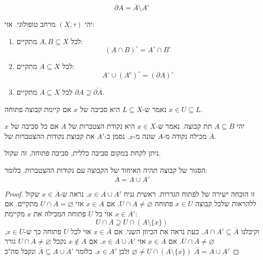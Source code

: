 \documentclass{tstextbook}
\begin{document}
\begin{definition}
$$\partial A=\overline{A} \setminus  A^{\circ }$$

\end{definition}
\begin{proposition}
יהי \((X,\tau)\) מרחב טופולוגי. אזי:

  \begin{enumerate}
    \item לכל \(A,B \subseteq X\) מתקיים: 
$$(A\cap  B)^{\circ }=A^{\circ }\cap  B^{\circ }$$


    \item לכל \(A\subseteq X\) מתקיים: 
$$A^{\circ }\cup  (A^{c})^{\circ }=(\partial A)^{\circ }$$


    \item לכל \(A\subseteq X\) מתקיים \(\partial A \supseteq \overline{\partial A}\). 


  \end{enumerate}
\end{proposition}
\begin{definition}
נאמר ש-\(L\subseteq X\) היא סביבה של \(x\) אם קיימת קבוצה פתוחה \(x \in U \subseteq L\).

\end{definition}
\begin{definition}
יהי \(A \subseteq B\) תת קבוצה. נאמר ש-\(x \in X\) היא נקודת הצטברות של \(A\) אם כל סביבה של \(x\) מכילה נקודה מ-\(A\) שונה מ-\(x\). נסמן ב-\(A'\) את קבוצת נקודות ההצטברות של \(A\).

\end{definition}
\begin{remark}
ניתן לקחת במקום סביבה כללית, סביבה פתוחה, זה שקול.

\end{remark}
\begin{proposition}
הסגור של קבוצה תהיה האיחוד של הקבוצה עם נקודות ההצטברות. כלומר:
$$\overline{A} =A\cup  A'$$

\end{proposition}
\begin{proof}
זו הוכחה ישירה של לפתוח הגדרות.
ראשית נניח \(x \in A\cup A'\). נראה ש-\(x \in \overline{A}\) שקול ללהראות שלכל קבוצה \(x \in U\) פתוחה \(U\cap A\neq \varnothing\).
אם \(x \in A\) אזי \(U\cap A = \varnothing\) מתקיים.
אם \(x \in A'\) אזי כל \(U\) פתוחה המכילה את \(x\) מקיימת:
$$U\cap  A \supseteq U\cap  (A\setminus  \{ x \})$$
וקיבלנו \(A\cap A'\subseteq \overline{A}\).
כעת נראה את הכיוון השני. אם \(x \in \overline{A}\) אזי לכל \(U\) פתוחה כך ש-\(x \in U\), \(U\cap A \neq \varnothing\).
אם \(x \in A\) אזי \(x \in A\cup A'\).
אם \(x \not\in A\) נקבל \(U\cap A \neq \varnothing\) גורר \(\varnothing \neq U \cap (A \setminus \{  x \})\) ולכן \(x \in A'\). כלומר \(\overline{A}\subseteq A\cup A'\) ונקבל סה"כ \(\overline{A}=A\cup A'\)

\end{proof}
\end{document}
